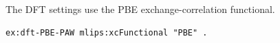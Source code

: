 The DFT settings use the PBE exchange-correlation functional.
\begin{lstlisting}[language=turtle]
ex:dft-PBE-PAW mlips:xcFunctional "PBE" .
\end{lstlisting}
